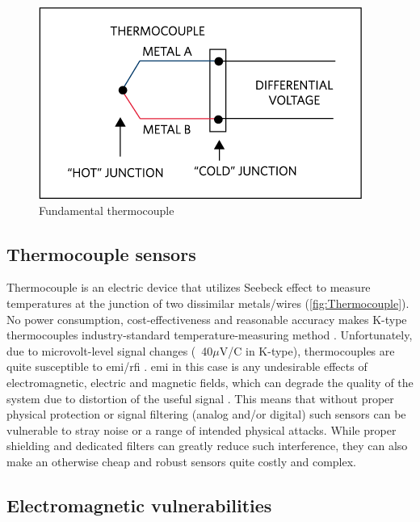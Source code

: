 \begin{figure} [h]
    \centering
    \includegraphics[width=\linewidth]{pictures/TC.png}
    \caption{Fundamental thermocouple \cite{Ismail17}}
    \label{fig:TCouple}
\end{figure}

\subsection{Thermocouple sensors}

Thermocouple is an electric device that utilizes Seebeck effect to measure temperatures at the junction of two dissimilar metals/wires (\cref{fig:Thermocouple}). No power consumption, cost-effectiveness and reasonable accuracy makes K-type thermocouples industry-standard temperature-measuring method \cite{Duff10}. Unfortunately, due to microvolt-level signal changes (~40$\mu$V/\textdegree{}C in K-type), thermocouples are quite susceptible to \ac{emi}/\ac{rfi} \cite{Smalcerz2013,Astm93}. \ac{emi} in this case is any undesirable effects of electromagnetic, electric and magnetic fields, which can degrade the quality of the system due to distortion of the useful signal \cite{Getz96}. This means that without proper physical protection or signal filtering (analog and/or digital) such sensors can be vulnerable to stray noise or a range of intended physical attacks. While proper shielding and dedicated filters can greatly reduce such interference, they can also make an otherwise cheap and robust sensors quite costly and complex. 

\subsection{Electromagnetic vulnerabilities}

